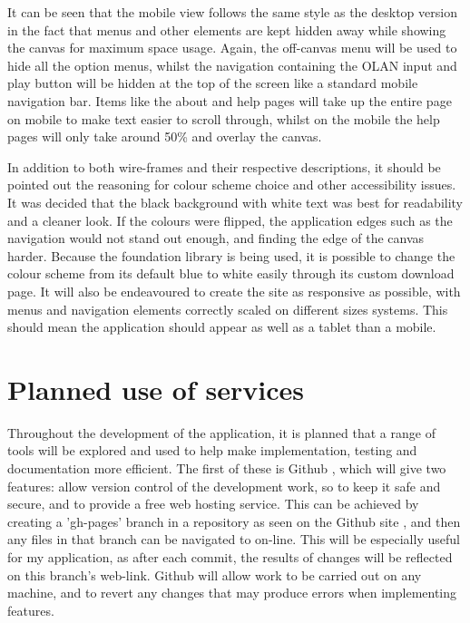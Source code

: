 It can be seen that the mobile view follows the same style as the desktop version in the fact that menus and other elements are kept hidden away while showing the canvas for maximum space usage. Again, the off-canvas menu will be used to hide all the option menus, whilst the navigation containing the OLAN input and play button will be hidden at the top of the screen like a standard mobile navigation bar. Items like the about and help pages will take up the entire page on mobile to make text easier to scroll through, whilst on the mobile the help pages will only take around 50\% and overlay the canvas. 

In addition to both wire-frames and their respective descriptions, it should be pointed out the reasoning for colour scheme choice and other accessibility issues. It was decided that the black background with white text was best for readability and a cleaner look. If the colours were flipped, the application edges such as the navigation would not stand out enough, and finding the edge of the canvas harder. Because the foundation library is being used, it is possible to change the colour scheme from its default blue to white easily through its custom download page. It will also be endeavoured to create the site as responsive as possible, with menus and navigation elements correctly scaled on different sizes systems. This should mean the application should appear as well as a tablet than a mobile.

\section{Planned use of services}
Throughout the development of the application, it is planned that a range of tools will be explored and used to help make implementation, testing and documentation more efficient. The first of these is Github \cite{github}, which will give two features: allow version control of the development work, so to keep it safe and secure, and to provide a free web hosting service. This can be achieved by creating a 'gh-pages' branch in a repository as seen on the Github site \cite{pages}, and then any files in that branch can be navigated to on-line. This will be especially useful for my application, as after each commit, the results of changes will be reflected on this branch's web-link. Github will allow work to be carried out on any machine, and to revert any changes that may produce errors when implementing features.

